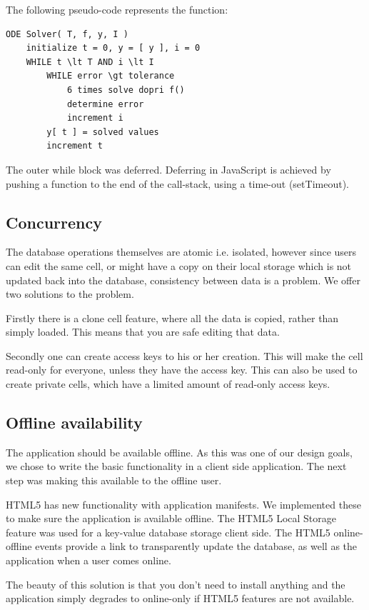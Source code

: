 \documentclass[10pt,a4paper]{report}
\begin{document}
			The following pseudo-code represents the function:
			
			\begin{lstlisting}
ODE Solver( T, f, y, I )
	initialize t = 0, y = [ y ], i = 0
	WHILE t \lt T AND i \lt I
		WHILE error \gt tolerance
			6 times solve dopri f()
			determine error
			increment i
		y[ t ] = solved values
		increment t
			\end{lstlisting}

			The outer while block was deferred. Deferring in JavaScript is achieved by pushing a function to the end of the call-stack, using a time-out (setTimeout).
		
		\subsection{Concurrency}
			The database operations themselves are atomic i.e. isolated, however since users can edit the same cell, or might have a copy on their local storage which is not updated back into the database, consistency between data is a problem. We offer two solutions to the problem.
			
			Firstly there is a clone cell feature, where all the data is copied, rather than simply loaded. This means that you are safe editing that data.
			
			Secondly one can create access keys to his or her creation. This will make the cell read-only for everyone, unless they have the access key. This can also be used to create private cells, which have a limited amount of read-only access keys.
		
		\subsection{Offline availability}
			The application should be available offline. As this was one of our design goals, we chose to write the basic functionality in a client side application. The next step was making this available to the offline user.
			
			HTML5 has new functionality with application manifests. We implemented these to make sure the application is available offline. The HTML5 Local Storage feature was used for a key-value database storage client side. The HTML5 online-offline events provide a link to transparently update the database, as well as the application when a user comes online.
			
			The beauty of this solution is that you don't need to install anything and the application simply degrades to online-only if HTML5 features are not available.
		
\end{document}
